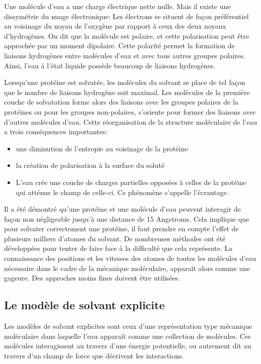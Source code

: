 Une molécule d'eau a une charge électrique nette nulle. Mais il existe une dissymétrie du nuage électronique: Les électrons se situent de façon préférentiel au voisinage du noyau de l'oxygène par rapport à ceux des deux noyaux d'hydrogènes.
On dit que la molécule est polaire, et cette polarisation peut être approchée par un moment dipolaire. Cette polarité permet la formation de liaisons hydrogènes entre molécules d'eau et avec tous autres groupes polaires. Ainsi, l'eau à l'état liquide possède beaucoup de liaisons hydrogènes.

Lorsqu'une protéine est solvatée, les molécules du solvant se place de tel façon que le nombre de liaisons hydrogène soit maximal. Les molécules de la première couche de solvatation forme alors des liaisons avec les groupes polaires de la protéines ou pour les groupes non-polaires, s'oriente pour former des liaisons avec d'autres molécules d'eau. Cette réorganisation de la structure moléculaire de l'eau a trois conséquences importantes:

\begin{itemize}
\item une diminution de l'entropie au voisinage de la protéine  
\item la création de polarisation à la surface du soluté
\item  L'eau crée une couche de charges partielles opposées à celles de la protéine qui atténue le champ de celle-ci. Ce phénomène s'appelle l'écrantage.
\end{itemize}
  
Il a été démontré qu'une protéine et une molécule d'eau peuvent interagir de façon non négligeable jusqu'à une distance de 15 Angstroms. Cela implique que pour solvater correctement une protéine, il faut prendre en compte l'effet de plusieurs milliers d'atomes du solvant.
De nombreuses méthodes ont été développées pour tenter de faire face à la difficulté que cela représente.
La connaissance des positions et les vitesses des atomes de toutes les molécules d'eau nécessaire dans le cadre de la mécanique moléculaire, apparaît alors comme une gageure. Des approches moins fines doivent être utilisées. 

\subsection{Le modèle de solvant explicite}

Les modèles de solvant explicites sont ceux d'une représentation type mécanique moléculaire dans laquelle l'eau apparaît comme une collection de molécules. Ces molécules interagissent au travers d'une énergie potentielle, ou autrement dit au travers d'un champ de force que décrivent les interactions.


